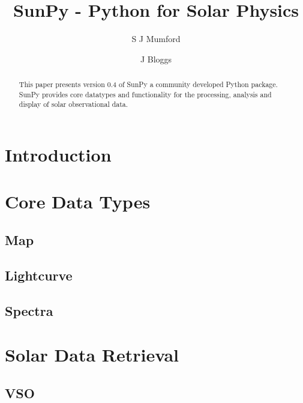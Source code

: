 \documentclass[12pt]{iopart}
\begin{document}
\title{SunPy - Python for Solar Physics}

\author{S J Mumford}
\address{Solar Physics \& Space Plasma Research Centre (SP$^{2}$RC), School of Mathematics and Statistics, The University of Sheffield, Hicks Building, Hounsfield Road, Sheffield, S3 7RH U.K.}

\author{J Bloggs}
\address{Wibble wiblle wiblle}


\begin{abstract}
This paper presents version 0.4 of SunPy a community developed Python package.
SunPy provides core datatypes and functionality for the processing, analysis and display of solar observational data.

\end{abstract}

\maketitle

\section{Introduction}

\section{Core Data Types}
	
	\subsection{Map}
	
	\subsection{Lightcurve}
	
	\subsection{Spectra}

\section{Solar Data Retrieval}

	\subsection{VSO}
	
\end{document}
